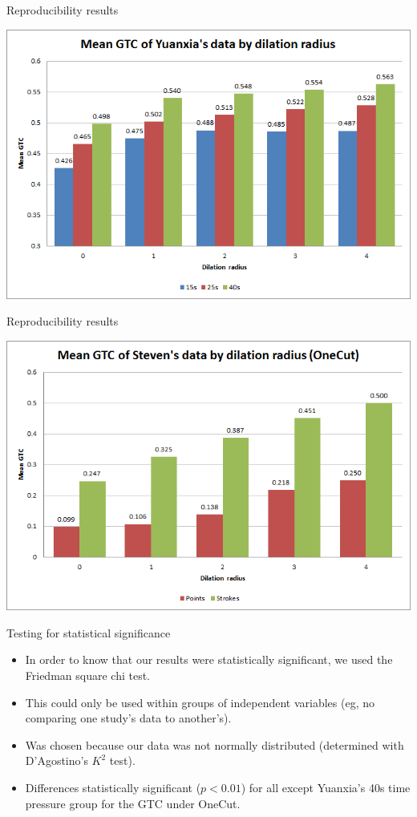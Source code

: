\documentclass[14pt,xcolor=dvipsnames]{beamer}
\begin{document}
\begin{frame}[fragile,t]{Reproducibility results}
	\begin{center}
		\includegraphics[width=\paperheight]{yuanxia_mean_gtc}
	\end{center}
\end{frame}

\begin{frame}[fragile,t]{Reproducibility results}
	\begin{center}
		\includegraphics[width=\paperheight]{steven_onecut_gtc}
	\end{center}
\end{frame}

\begin{frame}[fragile,t]{Testing for statistical significance}
	\begin{itemize}
		\item In order to know that our results were statistically significant, we used the Friedman square chi test.
		\item This could only be used within groups of independent variables (eg, no comparing one study's data to another's).
		\item Was chosen because our data was not normally distributed (determined with D'Agostino's $K^2$ test).
		\item Differences statistically significant ($p < 0.01$) for all except Yuanxia's 40s time pressure group for the GTC under OneCut.
	\end{itemize}
\end{frame}
\end{document}

